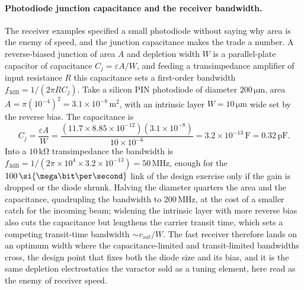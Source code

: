 \paragraph{Photodiode junction capacitance and the receiver bandwidth.}
The receiver examples specified a small photodiode without saying why area is the
enemy of speed, and the junction capacitance makes the trade a number. A
reverse-biased junction of area $A$ and depletion width $W$ is a parallel-plate
capacitor of capacitance $C_j = \varepsilon A/W$, and feeding a transimpedance
amplifier of input resistance $R$ this capacitance sets a first-order bandwidth
$f_{3\text{dB}} = 1/(2\pi R C_j)$. Take a silicon PIN photodiode of diameter
$200\,\si{\micro\meter}$, area $A = \pi(10^{-4})^{2} = 3.1\times 10^{-8}\,\si{
\meter\squared}$, with an intrinsic layer $W = 10\,\si{\micro\meter}$ wide set by
the reverse bias. The capacitance is
\[
C_j = \frac{\varepsilon A}{W}
    = \frac{(11.7\times 8.85\times 10^{-12})(3.1\times 10^{-8})}
           {10\times 10^{-6}}
    = 3.2\times 10^{-13}\,\si{\farad}
    = 0.32\,\si{\pico\farad}.
\]
Into a $10\,\si{\kilo\ohm}$ transimpedance the bandwidth is $f_{3\text{dB}} =
1/(2\pi\times 10^{4}\times 3.2\times 10^{-13}) = 50\,\si{\mega\hertz}$, enough for
the $100\,\si{\mega\bit\per\second}$ link of the design exercise only if the gain
is dropped or the diode shrunk. Halving the diameter quarters the area and the
capacitance, quadrupling the bandwidth to $200\,\si{\mega\hertz}$, at the cost of
a smaller catch for the incoming beam; widening the intrinsic layer with more
reverse bias also cuts the capacitance but lengthens the carrier transit time,
which sets a competing transit-time bandwidth $\sim v_{sat}/W$. The fast receiver
therefore lands on an optimum width where the capacitance-limited and
transit-limited bandwidths cross, the design point that fixes both the diode size
and its bias, and it is the same depletion electrostatics the varactor sold as a
tuning element, here read as the enemy of receiver speed.

